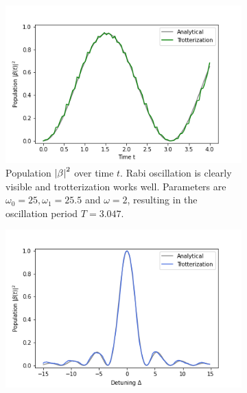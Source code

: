 \begin{figure}[h]
    \centering
    \caption{Comparison between analytical and trotterized calculations of population $\abs{\beta}^2$ for a driven two-level system. The time step for trotterization is $\delta t = 0.05$.}
    \label{fig:exercise06}
    \addtocounter{figure}{-1}
    \begin{subfigure}[t]{0.48\textwidth}
        \includegraphics[width=\textwidth]{tex/figures/exercise06_01.png}
        \caption{Population $\abs{\beta}^2$ over time $t$. Rabi oscillation is clearly visible and trotterization works well. Parameters are $\omega_0 = 25, \omega_1 = 25.5$ and $\omega = 2$, resulting in the oscillation period $T = 3.047$.}
        \label{fig:exercise06_01}
    \end{subfigure}
    \begin{subfigure}[t]{0.48\textwidth}
        \includegraphics[width=\textwidth]{tex/figures/exercise06_02.png}

\end{subfigure}
\end{figure}
